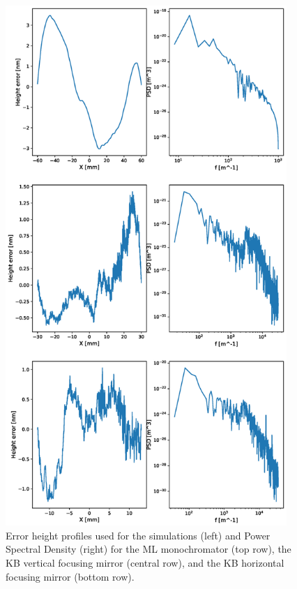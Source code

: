 \documentclass{iucr}              %
\newcommand{\todo}[1]{{\color{red}[TODO: "#1'']}}
\begin{document}
\begin{figure}\label{fig:metrology}
\includegraphics[width=0.95\textwidth]{GRAPHICS/metrology.eps}
\caption{Error height profiles used for the simulations (left) and Power Spectral Density (right) for the ML monochromator (top row), the KB vertical focusing mirror (central row), and the KB horizontal focusing mirror (bottom row).}
\end{figure}





\end{document}
